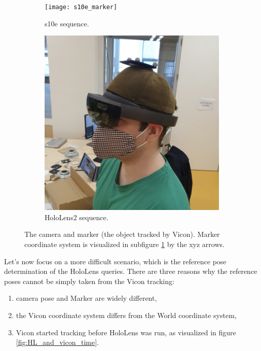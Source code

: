 \documentclass[twoside]{ctuthesis}
\theoremstyle{plain}
\theoremstyle{definition}
\theoremstyle{note}
\begin{document}
\begin{figure}
	\begin{subfigure}{0.45\textwidth}
		\texttt{[image: s10e\_marker]}
		\caption{s10e sequence.}
		\label{fig:s10e-marker}
	\end{subfigure}
	\hspace*{\fill}	%
	\begin{subfigure}{0.45\textwidth}
		\includegraphics[width=\textwidth]{HL1_marker}
		\caption{HoloLens2 sequence.}
		\label{fig:holoLens-marker}
	\end{subfigure}
	\caption{The camera and marker (the object tracked by Vicon). Marker coordinate system is visualized in subfigure \ref{fig:s10e-marker} by the xyz arrows.}
	\label{fig:camera-markers}
\end{figure}

Let's now focus on a more difficult scenario, which is the reference pose determination of the HoloLens queries. There are three reasons why the reference poses cannot be simply taken from the Vicon tracking:

\begin{enumerate}
	\item camera pose and Marker are widely different,
	\item the Vicon coordinate system differs from the World coordinate system,
	\item Vicon started tracking before HoloLens was run, as visualized in figure \ref{fig:HL_and_vicon_time}.
\end{enumerate}
\end{document}
